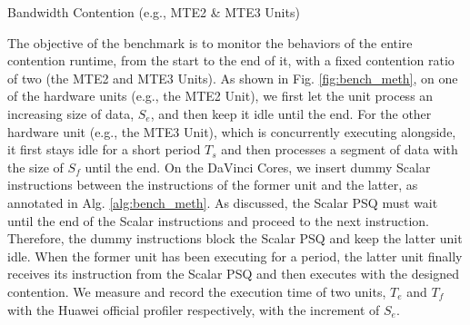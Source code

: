 \documentclass[12pt]{extbook}
\begin{document}
\begin{algorithm}[tbp]
    \caption{Bandwidth Contention (e.g., MTE2 \& MTE3 Units)}
    \label{alg:bench_meth}
        
        
    \BlankLine
            
    \BlankLine

\end{algorithm}

The objective of the benchmark is to monitor the behaviors of the entire contention runtime, from the start to the end of it, with a fixed contention ratio of two (the MTE2 and MTE3 Units). 
As shown in Fig. \ref{fig:bench_meth},
on one of the hardware units (e.g., the MTE2 Unit), we first let the unit process an increasing size of data, $S_{e}$, and then keep it idle until the end. For the other hardware unit (e.g., the MTE3 Unit), which is concurrently executing alongside, it first stays idle for a short period $T_{s}$ and then processes a segment of data with the size of $S_{f}$ until the end. 
On the DaVinci Cores, we insert dummy Scalar instructions between the instructions of the former unit and the latter, as annotated in Alg. \ref{alg:bench_meth}. 
As discussed, the Scalar PSQ must wait until the end of the Scalar instructions and proceed to the next instruction. Therefore, the dummy instructions block the Scalar PSQ and keep the latter unit idle. When the former unit has been executing for a period, the latter unit finally receives its instruction from the Scalar PSQ and then executes with the designed contention. We measure and record the execution time of two units, $T_{e}$ and $T_{f}$ with the Huawei official profiler respectively, with the increment of $S_{e}$.
\end{document}
